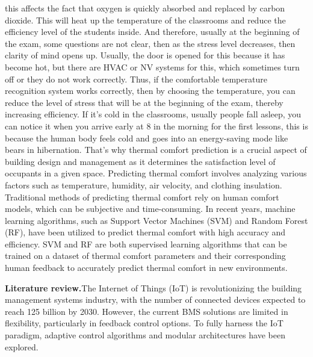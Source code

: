 this affects the fact that oxygen is quickly absorbed and replaced by
carbon dioxide. This will heat up the temperature of the classrooms and
reduce the efficiency level of the students inside. And therefore,
usually at the beginning of the exam, some questions are not clear, then
as the stress level decreases, then clarity of mind opens up. Usually,
the door is opened for this because it has become hot, but there are
HVAC or NV systems for this, which sometimes turn off or they do not
work correctly. Thus, if the comfortable temperature recognition system
works correctly, then by choosing the temperature, you can reduce the
level of stress that will be at the beginning of the exam, thereby
increasing efficiency. If it's cold in the classrooms, usually people
fall asleep, you can notice it when you arrive early at 8 in the morning
for the first lessons, this is because the human body feels cold and
goes into an energy-saving mode like bears in hibernation. That's why
thermal comfort prediction is a crucial aspect of building design and
management as it determines the satisfaction level of occupants in a
given space. Predicting thermal comfort involves analyzing various
factors such as temperature, humidity, air velocity, and clothing
insulation. Traditional methods of predicting thermal comfort rely on
human comfort models, which can be subjective and time-consuming. In
recent years, machine learning algorithms, such as Support Vector
Machines (SVM) and Random Forest (RF), have been utilized to predict
thermal comfort with high accuracy and efficiency. SVM and RF are both
supervised learning algorithms that can be trained on a dataset of
thermal comfort parameters and their corresponding human feedback to
accurately predict thermal comfort in new environments.

{\bfseries Literature review.}The Internet of Things (IoT) is
revolutionizing the building management systems industry, with the
number of connected devices expected to reach 125 billion by 2030.
However, the current BMS solutions are limited in flexibility,
particularly in feedback control options. To fully harness the IoT
paradigm, adaptive control algorithms and modular architectures have
been explored.

